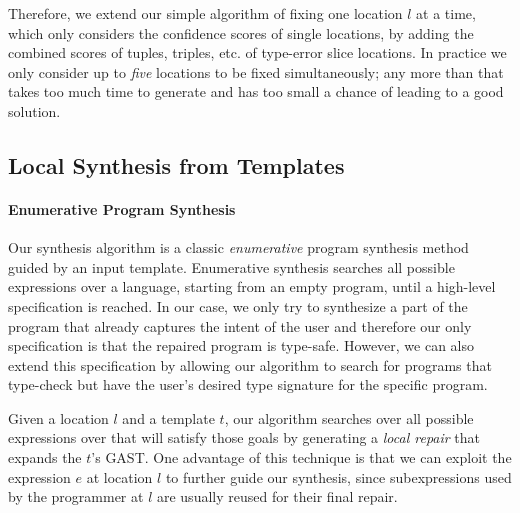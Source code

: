 Therefore, we extend our simple algorithm of fixing one location $l$ at a time,
which only considers the confidence scores of single locations, by adding the
combined scores of tuples, triples, etc. of type-error slice locations. In
practice we only consider up to \emph{five} locations to be fixed
simultaneously; any more than that takes too much time to generate and
has too small a chance of leading to a good solution.


\subsection{Local Synthesis from Templates}
\label{subsec:local-synthesis}

\paragraph{Enumerative Program Synthesis}
Our synthesis algorithm is a classic \emph{enumerative} program synthesis method
guided by an input template. Enumerative synthesis searches all possible
expressions over a language, starting from an empty program, until a high-level
specification is reached. In our case, we only try to synthesize a part of the
program that already captures the intent of the user and therefore our only
specification is that the repaired program is type-safe. However, we can also
extend this specification by allowing our algorithm to search for programs that
type-check but have the user's desired type signature for the specific program.

Given a location $l$ and a template $t$, our algorithm searches over all
possible expressions over \lang that will satisfy those goals by generating a
\emph{local repair} that expands the $t$'s GAST. One advantage of this technique
is that we can exploit the expression $e$ at location $l$ to further guide our
synthesis, since subexpressions used by the programmer at $l$ are usually reused
for their final repair.



